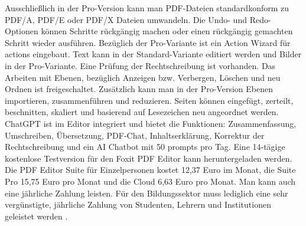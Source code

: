 Ausschließlich in der Pro-Version kann man PDF-Dateien standardkonform zu PDF/A, PDF/E oder PDF/X Dateien umwandeln. Die Undo- und Redo-Optionen können Schritte rückgängig machen oder einen rückgängig gemachten Schritt wieder ausführen. Bezüglich der Pro-Variante ist ein Action Wizard für actions eingebaut. Text kann in der Standard-Variante editiert werden und Bilder in der Pro-Variante. Eine Prüfung der Rechtschreibung ist vorhanden. Das Arbeiten mit Ebenen, bezüglich Anzeigen bzw. Verbergen, Löschen und neu Ordnen ist freigeschaltet. Zusätzlich kann man in der Pro-Version Ebenen importieren, zusammenführen und reduzieren. Seiten können eingefügt, zerteilt, beschnitten, skaliert und basierend auf Lesezeichen neu angeordnet werden. ChatGPT ist im Editor integriert und bietet die Funktionen: Zusammenfassung, Umschreiben, Übersetzung, PDF-Chat, Inhaltserklärung, Korrektur der Rechtschreibung und ein AI Chatbot mit 50 prompts pro Tag. Eine 14-tägige kostenlose Testversion für den Foxit PDF Editor kann heruntergeladen werden. Die PDF Editor Suite für Einzelpersonen kostet 12,37 Euro im Monat, die Suite Pro 15,75 Euro pro Monat und die Cloud 6,63 Euro pro Monat. Man kann auch eine jährliche Zahlung leisten. Für den Bildungssektor muss lediglich eine sehr vergünstigte, jährliche Zahlung von Studenten, Lehrern und Institutionen geleistet werden \cite{foxit-um}. 

